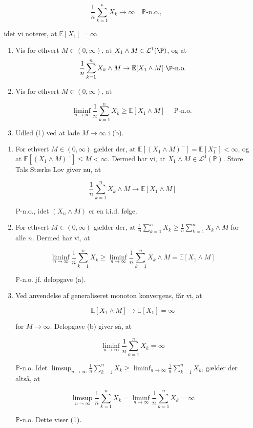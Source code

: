 \documentclass{Class}
\begin{document}
\begin{equation}
    \frac{1}{n} \sum_{k=1}^n X_k \rightarrow \infty \quad \mathbb{P} \text {-n.o., }
\end{equation}


idet vi noterer, at $\mathbb{E}\left[X_1\right]=\infty$.
\begin{enumerate}
    \item Vis for ethvert $M\in(0,\infty)$, at $X_1\wedge M\in\lclass^1(\P)$, og at
    $$\frac{1}{n}\sum_{k=1}^{n}X_k\wedge M \rightarrow \E[X_1\wedge M] \; \P\text{-n.o.}$$
    \item Vis for ethvert $M \in(0, \infty)$, at

    $$
    \liminf _{n \rightarrow \infty} \frac{1}{n} \sum_{k=1}^n X_k \geq \mathbb{E}\left[X_1 \wedge M\right] \quad \text { P-n.o. }
    $$
    \item Udled (1) ved at lade $M \rightarrow \infty$ i (b).     
\end{enumerate}
\solution
\begin{enumerate}
    \item For ethvert $M \in(0, \infty)$ gælder der, at $\mathbb{E}\left[\left(X_1 \wedge M\right)^{-}\right]=\mathbb{E}\left[X_1^{-}\right]<\infty$, og at $\mathbb{E}\left[\left(X_1 \wedge M\right)^{+}\right] \leq M<\infty$. Dermed har vi, at $X_1 \wedge M \in \mathcal{L}^1(\mathbb{P})$. Store Tals Stærke Lov giver nu, at

    $$
    \frac{1}{n} \sum_{k=1}^n X_k \wedge M \rightarrow \mathbb{E}\left[X_1 \wedge M\right]
    $$
    
    
    P-n.o., idet $\left(X_n \wedge M\right)$ er en i.i.d. følge.
    \item For ethvert $M \in(0, \infty)$ gælder der, at $\frac{1}{n} \sum_{k=1}^n X_k \geq \frac{1}{n} \sum_{k=1}^n X_k \wedge M$ for alle $n$. Dermed har vi, at

    $$
    \liminf _{n \rightarrow \infty} \frac{1}{n} \sum_{k=1}^n X_k \geq \liminf _{n \rightarrow \infty} \frac{1}{n} \sum_{k=1}^n X_k \wedge M=\mathbb{E}\left[X_1 \wedge M\right]
    $$
    
    $\mathbb{P}$-n.o. jf. delopgave (a).
    \item Ved anvendelse af generaliseret monoton konvergens, făr vi, at

    $$
    \mathbb{E}\left[X_1 \wedge M\right] \rightarrow \mathbb{E}\left[X_1\right]=\infty
    $$
    
    for $M \rightarrow \infty$. Delopgave (b) giver så, at
    
    $$
    \liminf _{n \rightarrow \infty} \frac{1}{n} \sum_{k=1}^n X_k=\infty
    $$
    
    $\mathbb{P}$-n.o. Idet $\limsup _{n \rightarrow \infty} \frac{1}{n} \sum_{k=1}^n X_k \geq \liminf _{n \rightarrow \infty} \frac{1}{n} \sum_{k=1}^n X_k$, gælder der altså, at
    
    $$
    \limsup _{n \rightarrow \infty} \frac{1}{n} \sum_{k=1}^n X_k=\liminf _{n \rightarrow \infty} \frac{1}{n} \sum_{k=1}^n X_k=\infty
    $$
    
    $\mathbb{P}$-n.o. Dette viser (1).
\end{enumerate}
\end{document}
